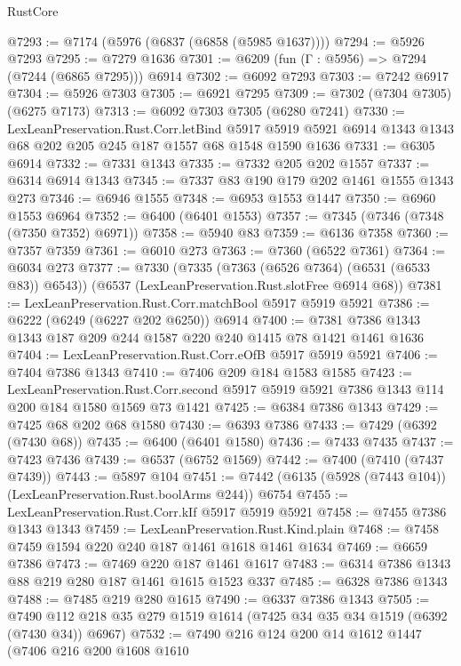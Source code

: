 \begin{lexlean}{RustCore}
\begin{coremodule}
@7293 := @7174 (@5976 (@6837 (@6858 (@5985 @1637))))
@7294 := @5926 @7293
@7295 := @7279 @1636
@7301 := @6209 (fun (Γ : @5956) => @7294 (@7244 (@6865 @7295))) @6914
@7302 := @6092 @7293
@7303 := @7242 @6917
@7304 := @5926 @7303
@7305 := @6921 @7295
@7309 := @7302 (@7304 @7305) (@6275 @7173)
@7313 := @6092 @7303 @7305 (@6280 @7241)
@7330 := LexLeanPreservation.Rust.Corr.letBind
    @5917
    @5919
    @5921
    @6914
    @1343
    @1343
    @68
    @202
    @205
    @245
    @187
    @1557
    @68
    @1548
    @1590
    @1636
@7331 := @6305 @6914
@7332 := @7331 @1343
@7335 := @7332 @205 @202 @1557
@7337 := @6314 @6914 @1343
@7345 := @7337 @83 @190 @179 @202 @1461 @1555 @1343 @273
@7346 := @6946 @1555
@7348 := @6953 @1553 @1447
@7350 := @6960 @1553 @6964
@7352 := @6400 (@6401 @1553)
@7357 := @7345 (@7346 (@7348 (@7350 @7352) @6971))
@7358 := @5940 @83
@7359 := @6136 @7358
@7360 := @7357 @7359
@7361 := @6010 @273
@7363 := @7360 (@6522 @7361)
@7364 := @6034 @273
@7377 := @7330
    (@7335 (@7363 (@6526 @7364) (@6531 (@6533 @83)) @6543))
    (@6537 (LexLeanPreservation.Rust.slotFree @6914 @68))
@7381 := LexLeanPreservation.Rust.Corr.matchBool @5917 @5919 @5921
@7386 := @6222 (@6249 (@6227 @202 @6250)) @6914
@7400 := @7381 @7386 @1343 @1343 @187 @209 @244 @1587 @220 @240 @1415 @78 @1421 @1461 @1636
@7404 := LexLeanPreservation.Rust.Corr.eOfB @5917 @5919 @5921
@7406 := @7404 @7386 @1343
@7410 := @7406 @209 @184 @1583 @1585
@7423 := LexLeanPreservation.Rust.Corr.second
    @5917
    @5919
    @5921
    @7386
    @1343
    @114
    @200
    @184
    @1580
    @1569
    @73
    @1421
@7425 := @6384 @7386 @1343
@7429 := @7425 @68 @202 @68 @1580
@7430 := @6393 @7386
@7433 := @7429 (@6392 (@7430 @68))
@7435 := @6400 (@6401 @1580)
@7436 := @7433 @7435
@7437 := @7423 @7436
@7439 := @6537 (@6752 @1569)
@7442 := @7400 (@7410 (@7437 @7439))
@7443 := @5897 @104
@7451 := @7442 (@6135 (@5928 (@7443 @104)) (LexLeanPreservation.Rust.boolArms @244)) @6754
@7455 := LexLeanPreservation.Rust.Corr.kIf @5917 @5919 @5921
@7458 := @7455 @7386 @1343 @1343
@7459 := LexLeanPreservation.Rust.Kind.plain
@7468 := @7458 @7459 @1594 @220 @240 @187 @1461 @1618 @1461 @1634
@7469 := @6659 @7386
@7473 := @7469 @220 @187 @1461 @1617
@7483 := @6314 @7386 @1343 @88 @219 @280 @187 @1461 @1615 @1523 @337
@7485 := @6328 @7386 @1343
@7488 := @7485 @219 @280 @1615
@7490 := @6337 @7386 @1343
@7505 := @7490 @112 @218 @35 @279 @1519 @1614 (@7425 @34 @35 @34 @1519 (@6392 (@7430 @34)) @6967)
@7532 := @7490
    @216
    @124
    @200
    @14
    @1612
    @1447
    (@7406
      @216
      @200
      @1608
      @1610

\end{coremodule}
\end{lexlean}
